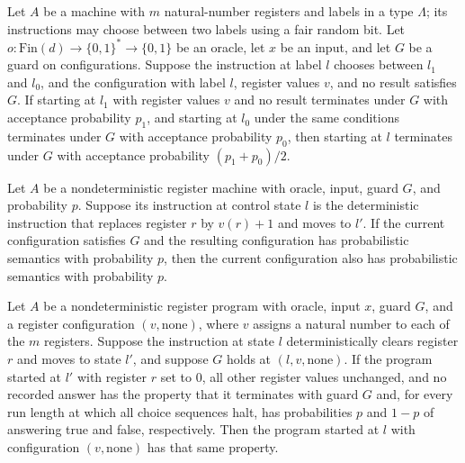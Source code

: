 \begin{lemma}
\label{Complexity.LogProg.PSem.choose}
\leanok
{}
Let $A$ be a machine with $m$ natural-number registers and labels in a type $\Lambda$; its
instructions may choose between two labels using a fair random bit. Let $o:\mathrm{Fin}(d)\to\{0,1\}^*\to\{0,1\}$ be an oracle, let $x$ be an input, and let $G$
be a guard on configurations. Suppose the instruction at label $l$ chooses between $l_1$ and $l_0$, and the configuration with label $l$,
register values $v$, and no result satisfies $G$. If starting at $l_1$ with register
values $v$ and no result terminates under $G$ with acceptance probability $p_1$, and
starting at $l_0$ under the same conditions terminates under $G$ with acceptance
probability $p_0$, then starting at $l$ terminates under $G$ with acceptance probability
$(p_1+p_0)/2$.
\end{lemma}

\begin{lemma}
\label{Complexity.LogProg.PSem.inc}
\leanok
{}
Let $A$ be a nondeterministic register machine with oracle, input, guard $G$, and
probability $p$. Suppose its instruction at control state $l$ is the deterministic
instruction that replaces register $r$ by $v(r)+1$ and moves to $l'$. If the current
configuration satisfies $G$ and the resulting configuration has probabilistic semantics
with probability $p$, then the current configuration also has probabilistic semantics
with probability $p$.
\end{lemma}

\begin{lemma}
\label{Complexity.LogProg.PSem.clr}
\leanok
{}
Let $A$ be a nondeterministic register program with oracle, input $x$, guard $G$, and a
register configuration $(v,\text{none})$, where $v$ assigns a natural number to each of
the $m$ registers. Suppose the instruction at state $l$ deterministically clears
register $r$ and moves to state $l'$, and suppose $G$ holds at $(l,v,\text{none})$. If
the program started at $l'$ with register $r$ set to $0$, all other register values
unchanged, and no recorded answer has the property that it terminates with guard $G$
and, for every run length at which all choice sequences halt, has probabilities $p$ and
$1-p$ of answering true and false, respectively. Then the program started at $l$ with
configuration $(v,\text{none})$ has that same property.
\end{lemma}

